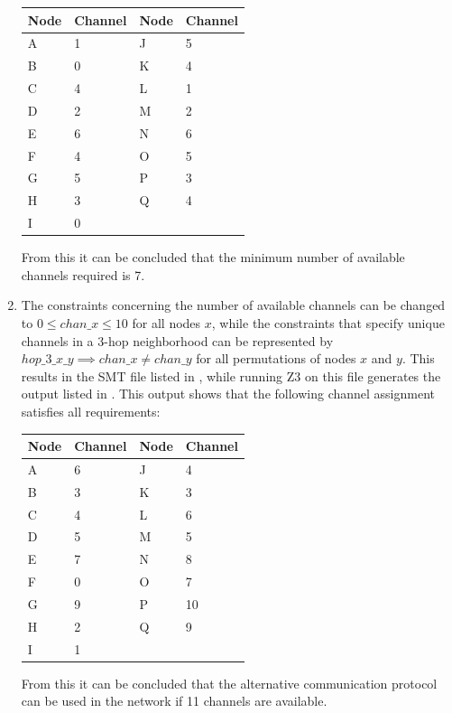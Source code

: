 \begin{enumerate}
\begin{table}[]
\begin{tabular}{ll|ll}
      Node & Channel & Node & Channel \\ \hline
      A    & 1       & J    & 5       \\
      B    & 0       & K    & 4       \\
      C    & 4       & L    & 1       \\
      D    & 2       & M    & 2       \\
      E    & 6       & N    & 6       \\
      F    & 4       & O    & 5       \\
      G    & 5       & P    & 3       \\
      H    & 3       & Q    & 4       \\
      I    & 0       &      &        
   \end{tabular}
  \end{table}
  From this it can be concluded that the minimum number of available channels required is 7.
  \item The constraints concerning the number of available channels can be changed to $0 \leq chan\_x \leq 10$ for all nodes $x$, while the constraints that specify unique channels in a 3-hop neighborhood can be represented by $hop\_3\_x\_y \implies chan\_x \neq chan\_y$ for all permutations of nodes $x$ and $y$. This results in the SMT file listed in , while running Z3 on this file generates the output listed in . This output shows that the following channel assignment satisfies all requirements:
  \begin{table}[]
    \begin{tabular}{ll|ll}
      Node & Channel & Node & Channel \\ \hline
      A    & 6       & J    & 4       \\
      B    & 3       & K    & 3       \\
      C    & 4       & L    & 6       \\
      D    & 5       & M    & 5       \\
      E    & 7       & N    & 8       \\
      F    & 0       & O    & 7       \\
      G    & 9       & P    & 10      \\
      H    & 2       & Q    & 9       \\
      I    & 1       &      &        
   \end{tabular}
  \end{table}
  From this it can be concluded that the alternative communication protocol can be used in the network if 11 channels are available.
\end{enumerate}
